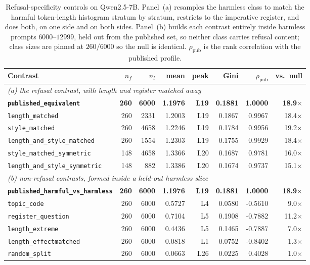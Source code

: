 \begin{table}[t]
\centering\small
\setlength{\tabcolsep}{3pt}
\begin{tabular}{lrrrrrrr}
\toprule
Contrast & $n_f$ & $n_l$ & mean & peak & Gini & $\rho_{\mathrm{pub}}$ & vs.\ null \\
\midrule
\multicolumn{8}{l}{\emph{(a) the refusal contrast, with length and register matched away}} \\
\textbf{\texttt{published\_equivalent}} & \textbf{260} & \textbf{6000} & \textbf{1.1976} & \textbf{L19} & \textbf{0.1881} & \textbf{1.0000} & \textbf{18.9}$\times$ \\
\texttt{length\_matched} & 260 & 2331 & 1.2003 & L19 & 0.1867 & 0.9967 & 18.4$\times$ \\
\texttt{style\_matched} & 260 & 4658 & 1.2246 & L19 & 0.1784 & 0.9956 & 19.2$\times$ \\
\texttt{length\_and\_style\_matched} & 260 & 1554 & 1.2303 & L19 & 0.1755 & 0.9929 & 18.4$\times$ \\
\texttt{style\_matched\_symmetric} & 148 & 4658 & 1.3366 & L20 & 0.1687 & 0.9781 & 16.0$\times$ \\
\texttt{length\_and\_style\_symmetric} & 148 & 882 & 1.3386 & L20 & 0.1674 & 0.9737 & 15.1$\times$ \\
\midrule
\multicolumn{8}{l}{\emph{(b) non-refusal contrasts, formed inside a held-out harmless slice}} \\
\textbf{\texttt{published\_harmful\_vs\_harmless}} & \textbf{260} & \textbf{6000} & \textbf{1.1976} & \textbf{L19} & \textbf{0.1881} & \textbf{1.0000} & \textbf{18.9}$\times$ \\
\texttt{topic\_code} & 260 & 6000 & 0.5727 & L4 & 0.0580 & -0.5610 & 9.0$\times$ \\
\texttt{register\_question} & 260 & 6000 & 0.7104 & L5 & 0.1908 & -0.7882 & 11.2$\times$ \\
\texttt{length\_extreme} & 260 & 6000 & 0.4436 & L5 & 0.1465 & -0.7887 & 7.0$\times$ \\
\texttt{length\_effectmatched} & 260 & 6000 & 0.0818 & L1 & 0.0752 & -0.8402 & 1.3$\times$ \\
\texttt{random\_split} & 260 & 6000 & 0.0663 & L26 & 0.0225 & 0.4028 & 1.0$\times$ \\
\bottomrule
\end{tabular}
\caption{Refusal-specificity controls on Qwen2.5-7B. Panel~(a) resamples the harmless class to
match the harmful token-length histogram stratum by stratum, restricts to the imperative
register, and does both, on one side and on both sides. Panel~(b) builds each contrast entirely
inside harmless prompts $6000$--$12999$, held out from the published set, so neither class
carries refusal content; class sizes are pinned at $260/6000$ so the null is identical.
$\rho_{\mathrm{pub}}$ is the rank correlation with the published profile.}
\label{tab:refusal-specificity}
\end{table}

